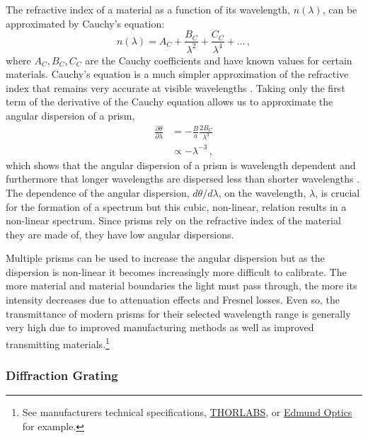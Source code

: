 The refractive index of a material as a function of its wavelength, $n(\lambda)$, can be approximated by Cauchy's equation:
\begin{equation} \label{eq:Cauchy}
    n(\lambda) = A_{C} + \frac{B_{C}}{\lambda^{2}} + \frac{C_{C}}{\lambda^{4}} + \dots\,,
\end{equation}
where $A_{C}, B_{C}, C_{C}$ are the Cauchy coefficients and have known values for certain materials.
Cauchy's equation is a much simpler approximation of the refractive index that remains very accurate at visible wavelengths \citep{JenkinsOptics}.
Taking only the first term of the derivative of the Cauchy equation allows us to approximate the angular dispersion of a prism,
\begin{equation} \label{eq:prism_angular_dispersion_approx}
    \begin{aligned}
        \frac{\partial \theta}{\partial \lambda} &= -\frac{B}{a}\frac{2B_{C}}{\lambda^{3}}\\
        &\propto -\lambda^{-3}\,,
    \end{aligned}
\end{equation}
which shows that the angular dispersion of a prism is wavelength dependent and furthermore that longer wavelengths are dispersed less than shorter wavelengths \citep{BirneyObsAstro, Hecht_optics}.
The dependence of the angular dispersion, $d\theta/d\lambda$, on the wavelength, $\lambda$, is crucial for the formation of a spectrum but this cubic, non-linear, relation results in a non-linear spectrum.
Since prisms rely on the refractive index of the material they are made of, they have low angular dispersions.

Multiple prisms can be used to increase the angular dispersion but as the dispersion is non-linear it becomes increasingly more difficult to calibrate.
The more material and material boundaries the light must pass through, the more its intensity decreases due to attenuation effects and Fresnel losses.
Even so, the transmittance of modern prisms for their selected wavelength range is generally very high due to improved manufacturing methods as well as improved transmitting materials.\footnote{See manufacturers technical specifications, \href{https://www.thorlabs.com/newgrouppage9.cfm?objectgroup_id=148}{THORLABS}, or \href{https://www.edmundoptics.eu/c/prisms/607/}{Edmund Optics} for example.}
\enlargethispage{-2\baselineskip}

\subsubsection{Diffraction Grating} \label{subsubsec:diff_grat}

